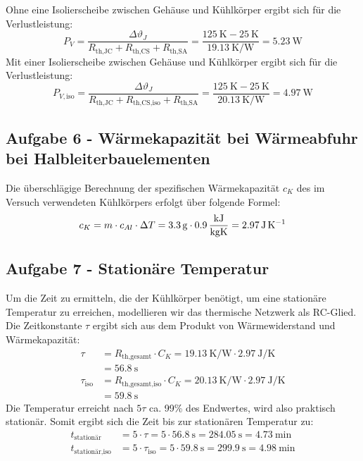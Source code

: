 Ohne eine Isolierscheibe zwischen Gehäuse und Kühlkörper ergibt sich für die Verlustleistung:
\begin{equation}
    P_V = \frac{\Delta \vartheta_J}{R_{\text{th,JC}} + R_{\text{th,CS}} + R_{\text{th,SA}} }
    = \frac{\SI{125}{\kelvin} - \SI{25}{\kelvin}}{\SI{19.13}{\kelvin\per\watt}}
    = \SI{5.23}{\watt}
\end{equation}
Mit einer Isolierscheibe zwischen Gehäuse und Kühlkörper ergibt sich für die Verlustleistung:
\begin{equation}
    P_{V, \text{iso}} = \frac{\Delta \vartheta_J}{R_{\text{th,JC}} + R_{\text{th,CS,iso}} + R_{\text{th,SA}} }
    = \frac{\SI{125}{\kelvin} - \SI{25}{\kelvin}}{\SI{20.13}{\kelvin\per\watt}}
    = \SI{4.97}{\watt}
\end{equation}

\subsection{Aufgabe 6 - Wärmekapazität bei Wärmeabfuhr bei Halbleiterbauelementen}
Die überschlägige Berechnung der spezifischen Wärmekapazität $c_K$ des im Versuch verwendeten Kühlkörpers erfolgt über folgende Formel:
\begin{equation}
    c_K = m \cdot c_{Al} \cdot \Delta T
    = \SI{3.3}{\gram} \cdot \SI{0.9}{\frac{\kilo\joule}{\kilogram\kelvin}}
    = \SI{2.97}{\joule\per\kelvin}
\end{equation}

\subsection{Aufgabe 7 - Stationäre Temperatur}
Um die Zeit zu ermitteln, die der Kühlkörper benötigt, um eine stationäre Temperatur zu erreichen, modellieren wir das thermische Netzwerk als RC-Glied.
Die Zeitkonstante $\tau$ ergibt sich aus dem Produkt von Wärmewiderstand und Wärmekapazität:
\begin{align}
    \tau              & = R_{\text{th,gesamt}} \cdot C_K = \SI{19.13}{\kelvin\per\watt} \cdot \SI{2.97}{\joule\per\kelvin}     \\ & = \SI{56.8}{\second} \nonumber \\
    \tau_{\text{iso}} & = R_{\text{th,gesamt,iso}} \cdot C_K = \SI{20.13}{\kelvin\per\watt} \cdot \SI{2.97}{\joule\per\kelvin} \\ & = \SI{59.8}{\second} \nonumber
\end{align}
Die Temperatur erreicht nach $5\tau$ ca. 99\% des Endwertes, wird also praktisch stationär.
Somit ergibt sich die Zeit bis zur stationären Temperatur zu:
\begin{align}
    t_{\text{stationär}}     & = 5 \cdot \tau = 5 \cdot \SI{56.8}{\second} = \SI{284.05}{\second} = \SI{4.73}{\minute}             \\
    t_{\text{stationär,iso}} & = 5 \cdot \tau_{\text{iso}} = 5 \cdot \SI{59.8}{\second} = \SI{299.9}{\second} = \SI{4.98}{\minute}
\end{align}

